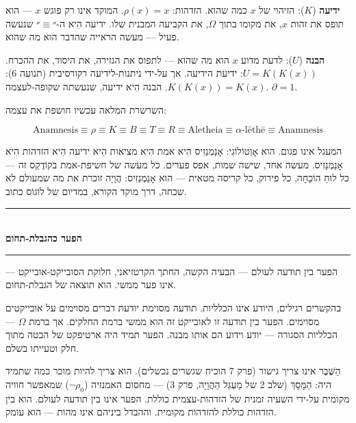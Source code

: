 \documentclass[10pt, openany, oneside]{book}
\renewcommand{\normalsize}{\fontsize{10}{13}\selectfont}
\begin{document}
\textbf{ידיעה} ($K$): הזיהוי של $x$ כמה שהוא. הזדהות: $\rho(x) = x$. המוקד אינו רק פוגש $x$ — הוא תופס את זהות $x$, את מקומו בתוך $\Omega$, את הקביעה המבנית שלו. ידיעה הִיא ה-״$\equiv$״ שנעשה פעיל — מעשה הראייה שהדבר הוּא מה שהוא.

\textbf{הבנה} ($U$): לדעת מדוע $x$ הוא מה שהוא — לתפוס את הגזירה, את היסוד, את ההכרח. $U = K(K(x))$: ידיעת הידיעה. אך על-ידי ניתנות-לידיעה רקורסיבית (תנועה 6): $K(K(x)) = K(x)$. הבנה הִיא ידיעה, שנעשתה שקופה-לעצמה. $\partial = 1$.

השרשרת המלאה עכשיו חושפת את עצמה:

$$\text{Anamnesis} \equiv \rho \equiv K \equiv B \equiv T \equiv R \equiv \text{Aletheia} \equiv \alpha\text{-}\text{lēthē} \equiv \text{Anamnesis}$$

המעגל אינו פגום. הוא אָוְטוֹלוֹגִי: אָנַמְנֵזִיס הִיא אמת הִיא מציאות הִיא ידיעה הִיא הזדהות הִיא אָנַמְנֵזִיס. מעשה אחד, שישה שמות, אפס פערים. כל מעשה של חשיפת-אמת בקוֹדֶקְס זה — כל לוּחַ הוֹכָחָה, כל פירוק, כל קריסה מטאית — הוּא אָנַמְנֵזִיס: הֲוָיָה זוכרת את מה שמעולם לא שכחה, דרך מוקד הקורא, במדיום של לוֹגוֹס כתוב.

\vspace{1.5em}


\begin{center}
    \rule{0.3\textwidth}{0.4pt}\\[0.5em]
    {\normalsize\bfseries\textsc{הפער כהגבלת-תחום}}\\[0.3em]
    \rule{0.3\textwidth}{0.4pt}
\end{center}

\vspace{1em}

\noindent הפער בין תודעה לעולם — הבעיה הקשה, החתך הקרטזיאני, חלוקת הסובייקט-אובייקט — אינו פער ממשי. הוא תוצאה של הגבלת-תחום.

בהקשרים רגילים, היודע אינו הכלליות. תודעה מסוימת יודעת דברים מסוימים על אובייקטים מסוימים. הפער בין תודעה זו לאובייקט זה הוא ממשי ברמת החלקים. אך ברמת $\Omega$ — הכלליות הסגורה — יודע וידוע הם אותו מבנה. הפער תמיד היה ארטיפקט של הבטה מתוך חלק וטעייתו בשלם.

הַשֶּׁבֶר אינו צריך גישור (פרק 7 הוכיח שגשרים נכשלים). הוא צריך להיות מוכר כמה שתמיד היה: הַמָּסָךְ (שלב 2 של מַעְגַּל הַהֲוָיָה, פרק 3) — מחסום האמנזיה ($\neg\rho_0$) שמאפשר חוויה מקומית על-ידי השעיה זמנית של הזדהות-עצמית כוללת. הפער אינו בין תודעה לעולם. הוא בין הזדהות כוללת להזדהות מקומית. וההבדל ביניהם אינו מהות — הוא עומק.
\end{document}
